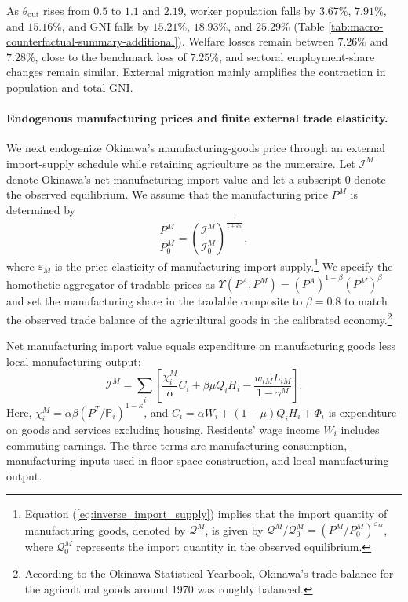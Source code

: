 \documentclass[12pt, unicode, a4paper]{article}
\newcommand{\1}{\mbox{1}\hspace{-0.25em}\mbox{l}} %
\begin{document}
As $\theta_{\mathrm{out}}$ rises from $0.5$ to $1.1$ and $2.19$, worker population falls by $3.67\%$, $7.91\%$, and $15.16\%$, and GNI falls by $15.21\%$, $18.93\%$, and $25.29\%$ (Table \ref{tab:macro-counterfactual-summary-additional}). Welfare losses remain between $7.26\%$ and $7.28\%$, close to the benchmark loss of $7.25\%$, and sectoral employment-share changes remain similar. External migration mainly amplifies the contraction in population and total GNI.

\paragraph{Endogenous manufacturing prices and finite external trade elasticity.}
We next endogenize Okinawa's manufacturing-goods price through an external import-supply schedule while retaining agriculture as the numeraire. Let $\mathcal{I}^M$ denote Okinawa's net manufacturing import value and let a subscript $0$ denote the observed equilibrium. We assume that the manufacturing price $P^M$ is determined by
\begin{equation}
    \frac{P^M}{P_0^M}
    =\left(\frac{\mathcal{I}^M}{\mathcal{I}_0^M}\right)^{\frac{1}{1+\varepsilon_M}},
    \label{eq:inverse_import_supply}
\end{equation}
where $\varepsilon_M$ is the price elasticity of manufacturing import supply.\footnote{Equation (\ref{eq:inverse_import_supply}) implies that the import quantity of manufacturing goods, denoted by $\mathcal{Q}^M$, is given by $\mathcal{Q}^M/\mathcal{Q}_0^M=\left( P^M/P_0^M \right)^{\varepsilon_M}$, where $\mathcal{Q}_0^M$ represents the import quantity in the observed equilibrium.}
We specify the homothetic aggregator of tradable prices as $\Upsilon(P^A,P^M)=\left( P^A \right)^{1-\beta}\left( P^M \right)^\beta$ and set the manufacturing share in the tradable composite to $\beta=0.8$ to match the observed trade balance of the agricultural goods in the calibrated economy.\footnote{According to the Okinawa Statistical Yearbook, Okinawa's trade balance for the agricultural goods around 1970 was roughly balanced. }

Net manufacturing import value equals expenditure on manufacturing goods less local manufacturing output:
\begin{equation}
\label{eq:manufacturing_import_accounting}
    \mathcal{I}^M=\sum_i\left[
        \frac{\chi_i^M}{\alpha}C_i
        +\beta\mu Q_iH_i
        -\frac{w_{iM}L_{iM}}{1-\gamma^M}
    \right].
\end{equation}
Here, $\chi_i^M=\alpha\beta(P^T/\mathbb{P}_i)^{1-\kappa}$, and $C_i=\alpha W_i+(1-\mu)Q_iH_i+\Phi_i$ is expenditure on goods and services excluding housing. Residents' wage income $W_i$ includes commuting earnings. The three terms are manufacturing consumption, manufacturing inputs used in floor-space construction, and local manufacturing output. 
\end{document}
